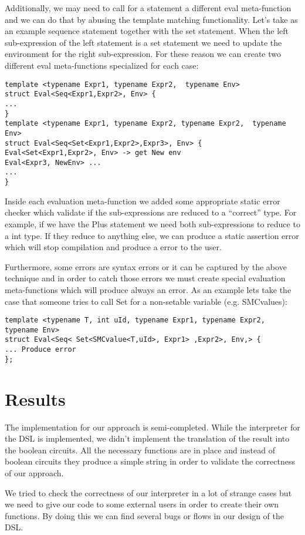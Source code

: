 \documentclass[paper=a4, fontsize=11pt]{scrartcl} %
\numberwithin{equation}{section} %
\numberwithin{figure}{section} %
\numberwithin{table}{section} %
\begin{document}
Additionally, we may need to call for a statement a different eval meta-function and we can do that by abusing the template matching functionality.  Let's take as an example sequence statement together with the set statement. When the left sub-expression of the left statement is a set statement we need to update the environment for the right sub-expression. For these reason we can create two different eval meta-functions specialized for each case:
\begin{lstlisting}
template <typename Expr1, typename Expr2,  typename Env>
struct Eval<Seq<Expr1,Expr2>, Env> {
...
}
template <typename Expr1, typename Expr2, typename Expr2,  typename Env>
struct Eval<Seq<Set<Expr1,Expr2>,Expr3>, Env> {
Eval<Set<Expr1,Expr2>, Env> -> get New env
Eval<Expr3, NewEnv> ...
...
}
\end{lstlisting}
Inside each evaluation meta-function we added some appropriate static error checker which validate if the sub-expressions are reduced to a ``correct'' type. For example, if we have the Plus statement we need both sub-expressions to reduce to a int type. If they reduce to anything else, we can produce a static assertion error which will stop compilation and produce a error to the user.

Furthermore, some errors are syntax errors or it can be captured by the above technique and in order to catch those errors we must create special evaluation meta-functions which will produce always an error. As an example lets take the case that someone tries to call Set for a non-setable variable (e.g. SMCvalues):
\begin{lstlisting}
template <typename T, int uId, typename Expr1, typename Expr2, typename Env>
struct Eval<Seq< Set<SMCvalue<T,uId>, Expr1> ,Expr2>, Env,> {
... Produce error
};
\end{lstlisting}
\section{Results}
The implementation for our approach is semi-completed. While the interpreter for the DSL is implemented, we didn't implement the translation of the result into the boolean circuits. All the necessary functions are in place and instead of boolean circuits they produce a simple string in order to validate the correctness of our approach. 

We tried to check the correctness of our interpreter in a lot of strange cases but we need to give our code to some external users in order to create their own functions. By doing this we can find several bugs or flows in our design of the DSL. 
\end{document}
